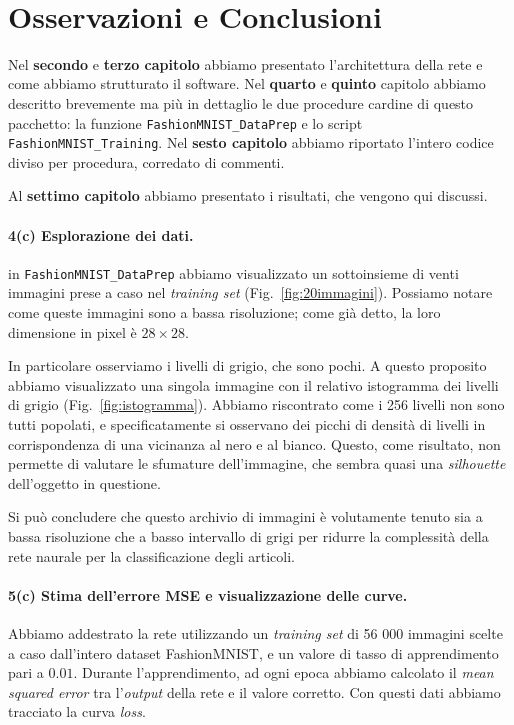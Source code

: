 \documentclass[a4paper,12pt]{article}
\begin{document}
\newpage ~ \newpage
\section{Osservazioni e Conclusioni} %

Nel \textbf{secondo} e \textbf{terzo capitolo} abbiamo presentato l'architettura della rete e come abbiamo strutturato il software. Nel \textbf{quarto} e \textbf{quinto} capitolo abbiamo descritto brevemente ma più in dettaglio le due procedure cardine di questo pacchetto: la funzione \texttt{FashionMNIST\_DataPrep} e lo script \texttt{FashionMNIST\_Training}. Nel \textbf{sesto capitolo} abbiamo riportato l'intero codice diviso per procedura, corredato di commenti.

Al \textbf{settimo capitolo} abbiamo presentato i risultati, che vengono qui discussi.

\paragraph{4(c) Esplorazione dei dati.}
in \texttt{FashionMNIST\_DataPrep} abbiamo visualizzato un sottoinsieme di venti immagini prese a caso nel \emph{training set} (Fig.~\vref{fig:20immagini}). Possiamo notare come queste immagini sono a bassa risoluzione; come già detto, la loro dimensione in pixel è $28\times28$. 

In particolare osserviamo i livelli di grigio, che sono pochi. A questo proposito abbiamo visualizzato una singola immagine con il relativo istogramma dei livelli di grigio (Fig.~\vref{fig:istogramma}). Abbiamo riscontrato come i 256 livelli non sono tutti popolati, e specificatamente si osservano dei picchi di densità di livelli in corrispondenza di una vicinanza al nero e al bianco. Questo, come risultato, non permette di valutare le sfumature dell'immagine, che sembra quasi una \emph{silhouette} dell'oggetto in questione.

Si può concludere che questo archivio di immagini è volutamente tenuto sia a bassa risoluzione che a basso intervallo di grigi per ridurre la complessità della rete naurale per la classificazione degli articoli.




\paragraph{5(c) Stima dell'errore MSE e visualizzazione delle curve.}
Abbiamo addestrato la rete utilizzando un \emph{training set} di 56 000 immagini scelte a caso dall'intero dataset FashionMNIST, e un valore di tasso di apprendimento pari a $0.01$. Durante l'apprendimento, ad ogni epoca abbiamo calcolato il \emph{mean squared error} tra l'\emph{output} della rete e il valore corretto. Con questi dati abbiamo tracciato la curva \emph{loss}.
\end{document}
